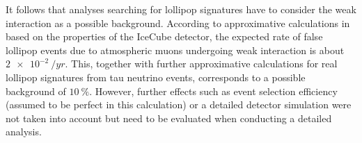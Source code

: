 It follows that analyses searching for lollipop signatures have to consider the weak interaction as a possible background.
According to approximative calculations in \cite{Sandrock:2018hpj} based on the properties of the IceCube detector, the expected rate of false lollipop events due to atmospheric muons undergoing weak interaction is about $\SI{2e-2}{\per yr}$. 
This, together with further approximative calculations for real lollipop signatures from tau neutrino events, corresponds to a possible background of $\SI{10}{\percent}$.
However, further effects such as event selection efficiency (assumed to be perfect in this calculation) or a detailed detector simulation were not taken into account but need to be evaluated when conducting a detailed analysis.
